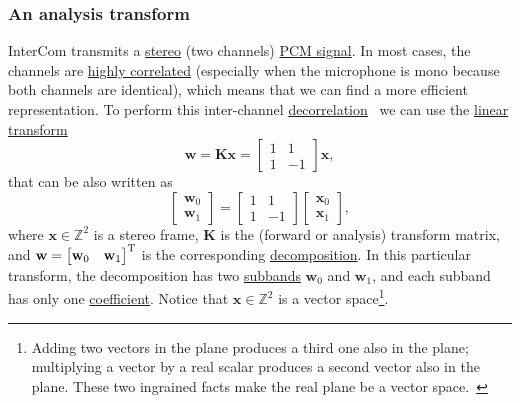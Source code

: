 \subsubsection{An analysis transform}
InterCom transmits a
\href{https://en.wikipedia.org/wiki/Stereophonic_sound}{stereo} (two
channels)
\href{https://en.wikipedia.org/wiki/Pulse-code_modulation}{PCM
  signal}. In most cases, the channels are
\href{https://en.wikipedia.org/wiki/Binaural_recording}{highly
  correlated} (especially when the microphone is mono because both
channels are identical), which means that we can find a more efficient
representation. To perform this inter-channel
\href{https://en.wikipedia.org/wiki/Decorrelation}{decorrelation}~\cite{thinkstats}
we can use the \href{https://en.wikipedia.org/wiki/Linear_map}{linear
  transform}~\cite{strang4linear}
\begin{equation}
  {\mathbf w} = {\mathbf K}{\mathbf x} =
\begin{bmatrix} 1 & 1 \\ 1 & -1 \end{bmatrix}
{\mathbf x},
  \label{eq:forward_transform_matrix_form}
\end{equation}
that can be also written as
\begin{equation}
  \begin{bmatrix}
    {\mathbf w}_0 \\
    {\mathbf w}_1
  \end{bmatrix}
  = 
  \begin{bmatrix} 1 & 1 \\ 1 & -1 \end{bmatrix}
  \begin{bmatrix}
    {\mathbf x}_0 \\
    {\mathbf x}_1
  \end{bmatrix},
  \label{eq:forward_transform_matrix_form2}
\end{equation}
where ${\mathbf x}\in\mathbb{Z}^2$ is a stereo frame, ${\mathbf K}$ is
the (forward or analysis) transform matrix, and ${\mathbf
  w}=\begin{bmatrix} {\mathbf w}_0 & {\mathbf w}_1\end{bmatrix}^{\text
  T}$ is the corresponding
\href{https://en.wikipedia.org/wiki/Discrete_wavelet_transform#Example_in_image_processing}{decomposition}. In
this particular transform, the decomposition has two
\href{https://en.wikipedia.org/wiki/Sub-band_coding}{subbands}
${\mathbf w}_0$ and ${\mathbf w}_1$, and each subband has only one
\href{https://web.stanford.edu/class/ee398a/handouts/lectures/07-TransformCoding.pdf}{coefficient}. Notice
that ${\mathbf x}\in\mathbb{Z}^2$ is a vector space\footnote{Adding
two vectors in the plane produces a third one also in the plane;
multiplying a vector by a real scalar produces a second vector also in
the plane. These two ingrained facts make the real plane be a vector
space.~\cite{vetterli2014foundations}}.

